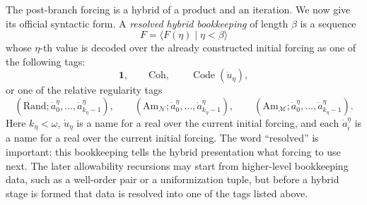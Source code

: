 \documentclass[a4paper,11pt]{article}
\begin{document}
The post-branch forcing is a hybrid of a product and an iteration.  We now give
its official syntactic form.  A \emph{resolved hybrid bookkeeping} of length
\(\beta\) is a sequence
\[
   F=\langle F(\eta)\mid \eta<\beta\rangle
\]
whose \(\eta\)-th value is decoded over the already constructed initial forcing
as one of the following tags:
\[
   \mathbf 1,
   \qquad
   \mathrm{Coh},
   \qquad
   \operatorname{Code}(\dot u_\eta),
\]
or one of the relative regularity tags
\[
   (\mathrm{Rand};\dot a^\eta_0,\ldots,\dot a^\eta_{k_\eta-1}),
   \qquad
   (\mathrm{Am}_{\mathcal N};\dot a^\eta_0,\ldots,\dot a^\eta_{k_\eta-1}),
   \qquad
   (\mathrm{Am}_{\mathcal M};\dot a^\eta_0,\ldots,\dot a^\eta_{k_\eta-1}).
\]
Here \(k_\eta<\omega\), \(\dot u_\eta\) is a name for a real over the current
initial forcing, and each \(\dot a^\eta_i\) is a name for a real over the
current initial forcing.  The word ``resolved'' is important: this bookkeeping
tells the hybrid presentation what forcing to use next.  The later allowability
recursions may start from higher-level bookkeeping data, such as a well-order
pair or a uniformization tuple, but before a hybrid stage is formed that data is
resolved into one of the tags listed above.
\end{document}
